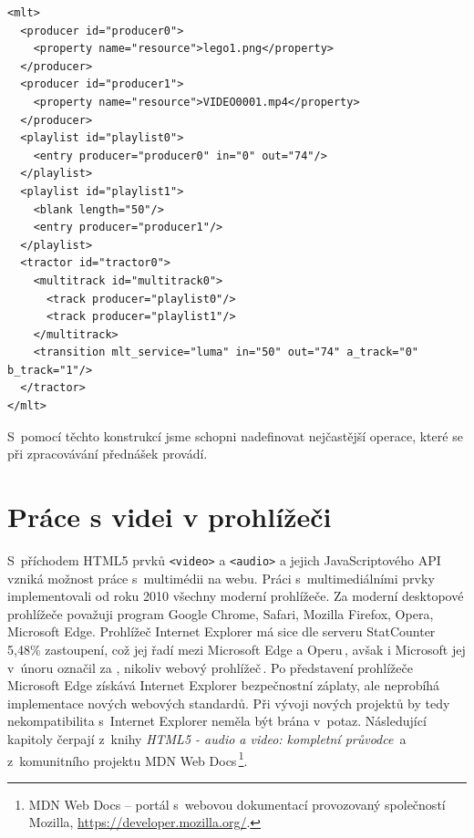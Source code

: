 \begin{lstlisting}[style=xml]
<mlt>
  <producer id="producer0">
    <property name="resource">lego1.png</property>
  </producer>
  <producer id="producer1">
    <property name="resource">VIDEO0001.mp4</property>
  </producer>
  <playlist id="playlist0">
    <entry producer="producer0" in="0" out="74"/>
  </playlist>
  <playlist id="playlist1">
    <blank length="50"/>
    <entry producer="producer1"/>
  </playlist>
  <tractor id="tractor0">
    <multitrack id="multitrack0">
      <track producer="playlist0"/>
      <track producer="playlist1"/>
    </multitrack>
    <transition mlt_service="luma" in="50" out="74" a_track="0" b_track="1"/>
  </tractor>
</mlt>
\end{lstlisting}

S~pomocí těchto konstrukcí jsme schopni nadefinovat nejčastější operace, které se při zpracovávání přednášek provádí.

\section{Práce s videi v prohlížeči}\label{cap:html}
S~příchodem HTML5 prvků \texttt{<video>} a \texttt{<audio>} a jejich JavaScriptového API vzniká možnost práce s~multimédii na webu. Práci s~multimediálními prvky implementovali od roku 2010 všechny moderní prohlížeče. Za moderní desktopové prohlížeče považuji program Google Chrome, Safari, Mozilla Firefox, Opera, Microsoft Edge. Prohlížeč Internet Explorer má sice dle serveru StatCounter 5,48\% zastoupení, což jej řadí mezi Microsoft Edge a Operu\,\cite{statcounter}, avšak i Microsoft jej v~únoru označil za , nikoliv webový prohlížeč\,\cite{internetExplorer}. Po představení prohlížeče Microsoft Edge získává Internet Explorer bezpečnostní záplaty, ale neprobíhá implementace nových webových standardů. Při vývoji nových projektů by tedy nekompatibilita s~Internet Explorer neměla být brána v~potaz. Následující kapitoly čerpají z~knihy \textit{HTML5 - audio a video: kompletní průvodce}\,\cite{HTML5multimedia} a z~komunitního projektu MDN Web Docs\,\footnote{MDN Web Docs -- portál s~webovou dokumentací provozovaný společností Mozilla, \url{https://developer.mozilla.org/}.}.

